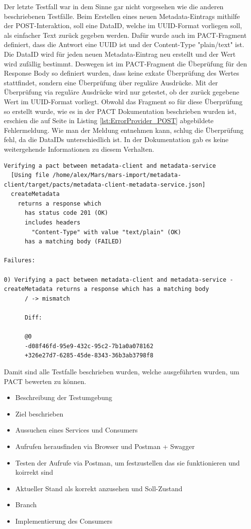 \documentclass{llncs}
\begin{document}
Der letzte Testfall war in dem Sinne gar nicht vorgesehen wie die anderen beschriebenen Testfälle. Beim Erstellen eines neuen Metadata-Eintrags mithilfe der POST-Interaktion, soll eine DataID, welche im UUID-Format vorliegen soll, als einfacher Text zurück gegeben werden. Dafür wurde auch im PACT-Fragment definiert, dass die Antwort eine UUID ist und der Content-Type "plain/text" ist. Die DataID wird für jeden neuen Metadata-Eintrag neu erstellt und der Wert wird zufällig bestimmt. Deswegen ist im PACT-Fragment die Übeprüfung für den Response Body so definiert wurden, dass keine exkate Überprüfung des Wertes stattfindet, sondern eine Überprüfung über reguläre Ausdrücke.  Mit der Überprüfung via reguläre Ausdrücke wird nur getestet, ob der zurück gegebene Wert im UUID-Format vorliegt. Obwohl das Fragment so für diese Überprüfung so erstellt wurde, wie es in der PACT Dokumentation beschrieben wurden ist, erschien die auf Seite \pageref{lst:ErrorProvider_POST} in Listing \ref{lst:ErrorProvider_POST} abgebildete Fehlermeldung. Wie man der Meldung entnehmen kann, schlug die Überprüfung fehl, da die DataIDs unterschiedlich ist. In der Dokumentation gab es keine weitergehende Informationen zu diesem Verhalten.

\begin{lstlisting}[caption=Test,label={lst:ErrorProvider_POST}]
Verifying a pact between metadata-client and metadata-service
  [Using file /home/alex/Mars/mars-import/metadata-client/target/pacts/metadata-client-metadata-service.json]
  createMetadata
    returns a response which
      has status code 201 (OK)
      includes headers
        "Content-Type" with value "text/plain" (OK)
      has a matching body (FAILED)

Failures:

0) Verifying a pact between metadata-client and metadata-service - createMetadata returns a response which has a matching body
      / -> mismatch

      Diff:

      @0
      -d08f46fd-95e9-432c-95c2-7b1a0a078162
      +326e27d7-6285-45de-8343-36b3ab3798f8
\end{lstlisting}

Damit sind alle Testfalle beschrieben wurden, welche ausgeführten wurden, um PACT bewerten zu können.

\begin{itemize}
\item Beschreibung der Testumgebung
\item Ziel beschrieben
\item Aussuchen eines Services und Consumers
\item Aufrufen herausfinden via Browser und Postman + Swagger
\item Testen der Aufrufe via Postman, um festzustellen das sie funktionieren und koirrekt sind
\item Aktueller Stand als korrekt anzusehen und Soll-Zustand
\item Branch
\item Implementierung des Consumers
\end{itemize}
\end{document}
